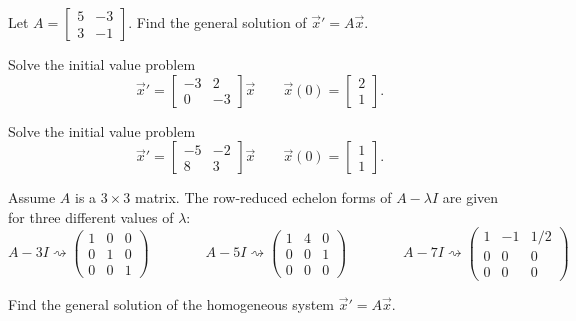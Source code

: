 \begin{exercise}
Let
$A = \left[ \begin{smallmatrix} 5 & -3 \\ 3 & -1 \end{smallmatrix} \right]$.
Find the general solution of ${\vec{x}}' = A \vec{x}$.
\end{exercise}

\begin{exercise}
Solve the initial value problem
\[ {\vec{x}}' = \begin{bmatrix} -3 & 2 \\ 0 & -3 \end{bmatrix} \vec{x} \qquad \vec{x}(0) = \begin{bmatrix} 2 \\ 1 \end{bmatrix} .\]
\end{exercise}


\begin{exercise}
Solve the initial value problem
\[ {\vec{x}}' = \begin{bmatrix} -5 & -2 \\ 8 & 3 \end{bmatrix} \vec{x} \qquad \vec{x}(0) = \begin{bmatrix} 1 \\ 1 \end{bmatrix}. \]
\end{exercise}

\begin{exercise}
Assume $A$ is a $3\times 3$ matrix. The row-reduced echelon forms of $A-\lambda I$ are given for three different values of $\lambda$:
$$A-3I \rightsquigarrow \begin{pmatrix} 1&0&0\\ 0&1&0\\ 0&0&1 \end{pmatrix} \qquad\qquad 
A-5I \rightsquigarrow \begin{pmatrix} 1&4&0\\ 0&0&1\\ 0&0&0 \end{pmatrix}\qquad\qquad
A-7I \rightsquigarrow \begin{pmatrix} 1&-1&1/2\\ 0&0&0\\ 0&0&0 \end{pmatrix}$$

Find the general solution of the homogeneous system $\vec{x}'=A\vec{x}$.
\end{exercise}

